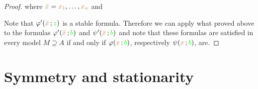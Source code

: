 \begin{proof}

  where ${\color{brown}\bar x}={\color{brown} x_1},\dots,{\color{brown} x_n}$ and 



  Note that $\varphi'({\color{brown}\bar x}\,;{\color{green} z})$ is a stable formula.
  Therefore we can apply what proved above to the formulas $\varphi'({\color{brown}\bar x}\,;{\color{green} b})$ and $\psi'({\color{brown}\bar x}\,;{\color{green} b})$ and note that these formulas are satisfied in every model $M\supseteq A$ if and only if $\varphi({\color{brown} x}\,;{\color{green} b})$, respectively $\psi({\color{brown} x}\,;{\color{green} b})$, are.
\end{proof}



\section{Symmetry and stationarity}
\label{stationarity}

